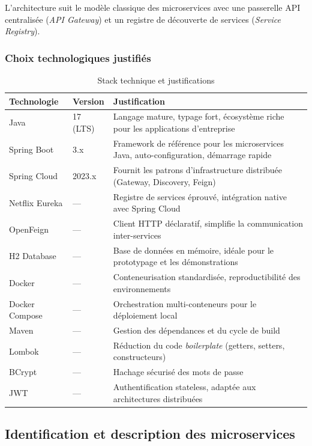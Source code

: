 \documentclass[12pt,a4paper]{article}
\begin{document}
L'architecture suit le modèle classique des microservices avec une passerelle API centralisée (\textit{API Gateway}) et un registre de découverte de services (\textit{Service Registry}).

\subsubsection{Choix technologiques justifiés}

\begin{table}[H]
\centering
\caption{Stack technique et justifications}
\label{tab:stack}
\begin{tabularx}{\textwidth}{|l|l|X|}
\hline
\textbf{Technologie} & \textbf{Version} & \textbf{Justification} \\
\hline
Java & 17 (LTS) & Langage mature, typage fort, écosystème riche pour les applications d'entreprise \\
\hline
Spring Boot & 3.x & Framework de référence pour les microservices Java, auto-configuration, démarrage rapide \\
\hline
Spring Cloud & 2023.x & Fournit les patrons d'infrastructure distribuée (Gateway, Discovery, Feign) \\
\hline
Netflix Eureka & --- & Registre de services éprouvé, intégration native avec Spring Cloud \\
\hline
OpenFeign & --- & Client HTTP déclaratif, simplifie la communication inter-services \\
\hline
H2 Database & --- & Base de données en mémoire, idéale pour le prototypage et les démonstrations \\
\hline
Docker & --- & Conteneurisation standardisée, reproductibilité des environnements \\
\hline
Docker Compose & --- & Orchestration multi-conteneurs pour le déploiement local \\
\hline
Maven & --- & Gestion des dépendances et du cycle de build \\
\hline
Lombok & --- & Réduction du code \textit{boilerplate} (getters, setters, constructeurs) \\
\hline
BCrypt & --- & Hachage sécurisé des mots de passe \\
\hline
JWT & --- & Authentification stateless, adaptée aux architectures distribuées \\
\hline
\end{tabularx}
\end{table}

\subsection{Identification et description des microservices}
\end{document}
